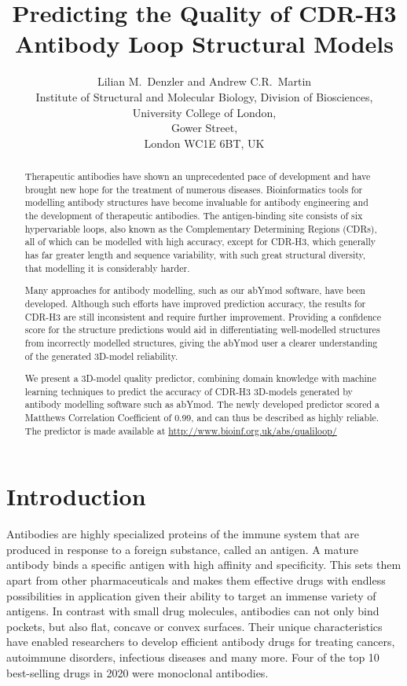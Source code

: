 \documentclass[12pt]{article}
\title{Predicting the Quality of CDR-H3 Antibody Loop Structural Models}
\author{Lilian M.\ Denzler and Andrew C.R.\ Martin\\
Institute of Structural and Molecular Biology, Division of Biosciences,\\
University College of London,\\
Gower Street,\\
London WC1E 6BT, UK
}
\begin{document}
\maketitle

\begin{abstract}
  Therapeutic antibodies have shown an unprecedented pace of
  development and have brought new hope for the treatment of numerous
  diseases. Bioinformatics tools for modelling antibody structures
  have become invaluable for antibody engineering and the development
  of therapeutic antibodies. The antigen-binding site consists of six
  hypervariable loops, also known as the Complementary Determining
  Regions (CDRs), all of which can be modelled with high accuracy,
  except for CDR-H3, which generally has
  far greater length and sequence variability, with such great structural
  diversity, that modelling it is considerably harder.

  Many approaches for antibody modelling, such as our
  abYmod software, have been developed. Although such efforts have
  improved prediction accuracy, the results for CDR-H3 are
  still inconsistent and require further improvement. Providing a
  confidence score for the structure predictions would aid in
  differentiating well-modelled structures from incorrectly modelled
  structures, giving the abYmod user a clearer understanding of the
  generated 3D-model reliability.

  We present a 3D-model quality predictor, combining domain knowledge
  with machine learning techniques to predict the accuracy of CDR-H3
  3D-models generated by antibody modelling software such as abYmod. The
  newly developed predictor scored a Matthews Correlation Coefficient
  of 0.99, and can thus be described as highly reliable. The predictor
  is made available at \url{http://www.bioinf.org.uk/abs/qualiloop/}
\end{abstract}

\section{Introduction}

Antibodies are highly specialized proteins of the immune system that
are produced in response to a foreign substance, called an antigen. A
mature antibody binds a specific antigen with high affinity and specificity. This sets them apart from other pharmaceuticals and makes them effective drugs with endless possibilities in application given their ability to target an immense variety of antigens.
In contrast with small drug molecules, antibodies can not
only bind pockets, but also flat, concave or convex
surfaces\cite{MacCallum1996}. Their unique characteristics have enabled 
researchers to develop efficient antibody drugs for treating cancers,
autoimmune disorders, infectious diseases and many more\cite{Lu2020}.
Four of the top 10 best-selling drugs in
2020 were monoclonal antibodies\cite{Urquhart2021}.
\end{document}

